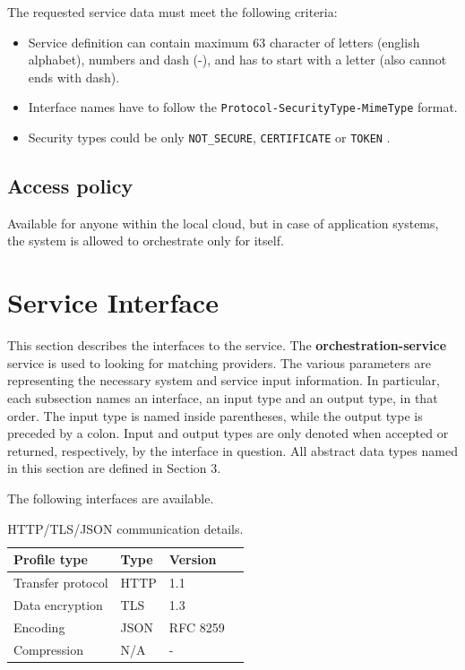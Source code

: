 \documentclass[a4paper]{arrowhead}
\begin{document}
The requested service data must meet the following criteria:

\begin{itemize}
    \item Service definition can contain maximum 63 character of letters (english alphabet), numbers and dash (-), and has to start with a letter (also cannot ends with dash).
    \item Interface names have to follow the \texttt{Protocol-SecurityType-MimeType} format.
    \item Security types could be only \texttt{NOT\_SECURE}, \texttt{CERTIFICATE} or \texttt{TOKEN} .
\end{itemize}

\subsection{Access policy}
\label{sec:accesspolicy}

Available for anyone within the local cloud, but in case of application systems, the system is allowed to orchestrate only for itself. 

\newpage

\section{Service Interface}
\label{sec:functions}

This section describes the interfaces to the service. The \textbf{orchestration-service} service is used to looking for matching providers. The various parameters are representing the necessary system and service input information.
In particular, each subsection names an interface, an input type and an output type, in that order.
The input type is named inside parentheses, while the output type is preceded by a colon.
Input and output types are only denoted when accepted or returned, respectively, by the interface in question. All abstract data types named in this section are defined in Section 3.

The following interfaces are available.


\begin{table}[ht!]
  \centering
  \begin{tabular}{|l|l|l|l|}
    \rowcolor{gray!33} Profile type & Type & Version \\ \hline
    Transfer protocol & HTTP & 1.1 \\ \hline
    Data encryption & TLS & 1.3 \\ \hline
    Encoding & JSON & RFC 8259 \cite{rfc8259} \\ \hline
    Compression & N/A & - \\ \hline
  \end{tabular}
  \caption{HTTP/TLS/JSON communication details.}
  \label{tab:comunication_semantics_profile}
\end{table}
\end{document}
